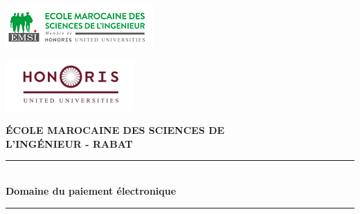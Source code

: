 \documentclass[a4paper,15pt]{report}
\begin{document}
	\begin{center}
		\vspace*{-2.3cm}
		
		\noindent
		\hspace*{0.4cm}
		\begin{minipage}{0.4\textwidth}
			\includegraphics[width=\textwidth]{logoemsi.png}
		\end{minipage}
		\hfill
		\begin{minipage}{0.4\textwidth}
			\includegraphics[width=\textwidth]{honoris.png}
		\end{minipage}
		\hspace*{0.8cm}
		
		\vspace{3cm}
		
		{\large \textbf{ÉCOLE MAROCAINE DES SCIENCES DE}\\[0.3cm]
			\textbf{L'INGÉNIEUR - RABAT}}
		
		\vspace{3cm}
		
		\rule{14cm}{0.5pt}\\[0.5cm]
		{\Large \textbf{Domaine du paiement électronique}}\\[0.5cm]
		\rule{14cm}{0.5pt}
	\end{center}
	
	\vspace{3cm}
	
\end{document}
